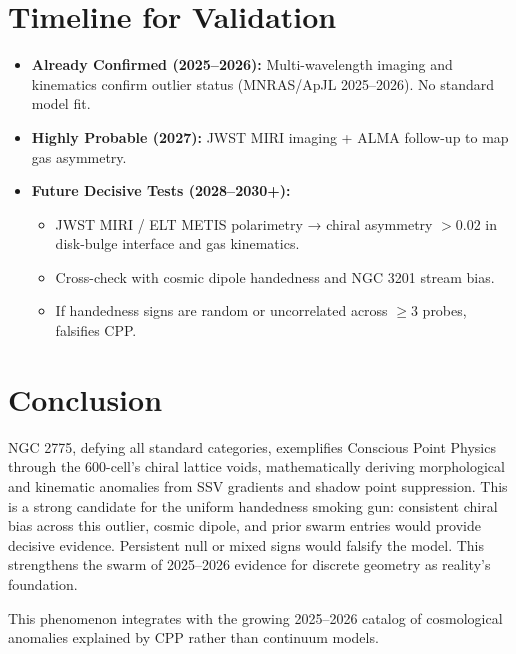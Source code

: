 \documentclass[11pt]{article}
\begin{document}
\section{Timeline for Validation}
\begin{itemize}
    \item \textbf{Already Confirmed (2025--2026):} Multi-wavelength imaging and kinematics confirm outlier status (MNRAS/ApJL 2025--2026). No standard model fit.
    \item \textbf{Highly Probable (2027):} JWST MIRI imaging + ALMA follow-up to map gas asymmetry.
    \item \textbf{Future Decisive Tests (2028--2030+):}
    \begin{itemize}
        \item JWST MIRI / ELT METIS polarimetry → chiral asymmetry $>0.02$ in disk-bulge interface and gas kinematics.
        \item Cross-check with cosmic dipole handedness and NGC 3201 stream bias.
        \item If handedness signs are random or uncorrelated across $\geq 3$ probes, falsifies CPP.
    \end{itemize}
\end{itemize}

\section{Conclusion}
NGC 2775, defying all standard categories, exemplifies Conscious Point Physics through the 600-cell's chiral lattice voids, mathematically deriving morphological and kinematic anomalies from SSV gradients and shadow point suppression. This is a strong candidate for the uniform handedness smoking gun: consistent chiral bias across this outlier, cosmic dipole, and prior swarm entries would provide decisive evidence. Persistent null or mixed signs would falsify the model. This strengthens the swarm of 2025--2026 evidence for discrete geometry as reality's foundation.

This phenomenon integrates with the growing 2025--2026 catalog of cosmological anomalies explained by CPP rather than continuum models.
\end{document}
